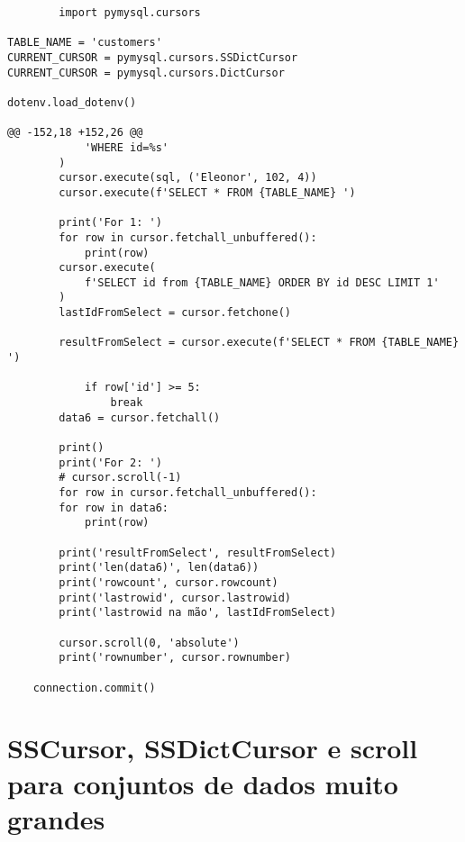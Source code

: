 \documentclass{article}
\begin{document}
    \begin{lstlisting}
        import pymysql.cursors

TABLE_NAME = 'customers'
CURRENT_CURSOR = pymysql.cursors.SSDictCursor
CURRENT_CURSOR = pymysql.cursors.DictCursor

dotenv.load_dotenv()

@@ -152,18 +152,26 @@
            'WHERE id=%s'
        )
        cursor.execute(sql, ('Eleonor', 102, 4))
        cursor.execute(f'SELECT * FROM {TABLE_NAME} ')

        print('For 1: ')
        for row in cursor.fetchall_unbuffered():
            print(row)
        cursor.execute(
            f'SELECT id from {TABLE_NAME} ORDER BY id DESC LIMIT 1'
        )
        lastIdFromSelect = cursor.fetchone()

        resultFromSelect = cursor.execute(f'SELECT * FROM {TABLE_NAME} ')

            if row['id'] >= 5:
                break
        data6 = cursor.fetchall()

        print()
        print('For 2: ')
        # cursor.scroll(-1)
        for row in cursor.fetchall_unbuffered():
        for row in data6:
            print(row)

        print('resultFromSelect', resultFromSelect)
        print('len(data6)', len(data6))
        print('rowcount', cursor.rowcount)
        print('lastrowid', cursor.lastrowid)
        print('lastrowid na mão', lastIdFromSelect)

        cursor.scroll(0, 'absolute')
        print('rownumber', cursor.rownumber)

    connection.commit()
    \end{lstlisting}

    \section{SSCursor, SSDictCursor e scroll para conjuntos de dados muito grandes}
  
\end{document}
